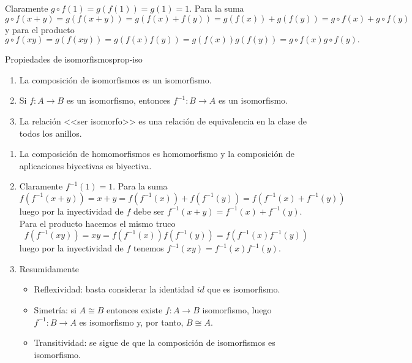\begin{proofbox}
    Claramente $g \circ f (1) = g(f(1)) = g(1) = 1$. Para la suma
    \[
    g \circ f (x + y) = g(f(x + y)) = g(f(x) + f(y)) = g(f(x)) + g(f(y)) = g \circ f (x) + g \circ f (y)
    \]
    y para el producto
    \[
    g \circ f (xy) = g(f(xy)) = g(f(x)f(y)) = g(f(x))g(f(y)) = g \circ f (x) g \circ f (y).
    \]
\end{proofbox}

\begin{proposition}{Propiedades de isomorfismos}{prop-iso}
    \begin{enumerate}
        \item La composición de isomorfismos es un isomorfismo.
        \item Si \(f: A \to B\) es un isomorfismo, entonces \(f^{-1}: B \to A\) es un isomorfismo.
        \item La relación <<ser isomorfo>> es una relación de equivalencia en la clase de todos los anillos.
    \end{enumerate}
\end{proposition}

\begin{proofbox}
    \begin{enumerate}
        \item La composición de homomorfismos es homomorfismo y la composición de aplicaciones biyectivas es biyectiva.

        \item Claramente $f^{-1}(1) = 1$. Para la suma
        \[
        f(f^{-1}(x + y)) = x + y = f(f^{-1}(x)) + f(f^{-1}(y)) = f(f^{-1}(x) + f^{-1}(y))
        \]
        luego por la inyectividad de $f$ debe ser $f^{-1}(x + y) = f^{-1}(x) + f^{-1}(y)$.
        Para el producto hacemos el mismo truco
        \[
        f(f^{-1}(xy)) = xy = f(f^{-1}(x))f(f^{-1}(y)) = f(f^{-1}(x)f^{-1}(y))
        \]
        luego por la inyectividad de $f$ tenemos $f^{-1}(xy) = f^{-1}(x) f^{-1}(y)$.
        \item Resumidamente
        \begin{itemize}
            \item Reflexividad: basta considerar la identidad $id$ que es isomorfismo.

            \item Simetría: si $A \cong B$ entonces existe $f: A \to B$ isomorfismo, luego $f^{-1} : B \to A$ es isomorfismo y, por tanto, $B \cong A$.

            \item Transitividad: se sigue de que la composición de isomorfismos es isomorfismo.
        \end{itemize}
    \end{enumerate}
\end{proofbox}

